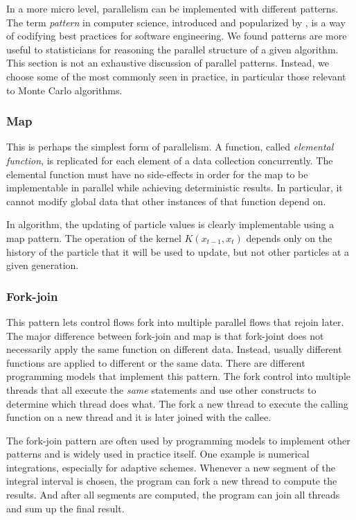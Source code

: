 In a more micro level, parallelism can be implemented with different patterns.
The term \emph{pattern} in computer science, introduced and popularized by
\cite{software:GoF}, is a way of codifying best practices for software
engineering. We found patterns are more useful to statisticians for reasoning
the parallel structure of a given algorithm. This section is not an exhaustive
discussion of parallel patterns. Instead, we choose some of the most commonly
seen in practice, in particular those relevant to Monte Carlo algorithms.

\subsubsection{Map}
\label{ssub:Map}

This is perhaps the simplest form of parallelism. A function, called
\emph{elemental function}, is replicated for each element of a data collection
concurrently. The elemental function must have no side-effects in order for
the map to be implementable in parallel while achieving deterministic results.
In particular, it cannot modify global data that other instances of that
function depend on.

In \smc algorithm, the updating of particle values is clearly implementable
using a map pattern. The operation of the kernel $K(x_{t-1},x_t)$ depends only
on the history of the particle that it will be used to update, but not other
particles at a given generation.

\subsubsection{Fork-join}
\label{ssub:Fork-join}

This pattern lets control flows fork into multiple parallel flows that rejoin
later. The major difference between fork-join and map is that fork-joint does
not necessarily apply the same function on different data. Instead, usually
different functions are applied to different or the same data. There are
different programming models that implement this pattern. The \openmp
{} fork control into multiple threads that all
execute the \emph{same} statements and use other constructs to determine which
thread does what. The \cilk \cite{cilk}  fork a new thread to
execute the calling function on a new thread and it is later joined with the
callee.

The fork-join pattern are often used by programming models to implement other
patterns and is widely used in practice itself. One example is numerical
integrations, especially for adaptive schemes. Whenever a new segment of the
integral interval is chosen, the program can fork a new thread to compute the
results. And after all segments are computed, the program can join all threads
and sum up the final result.

